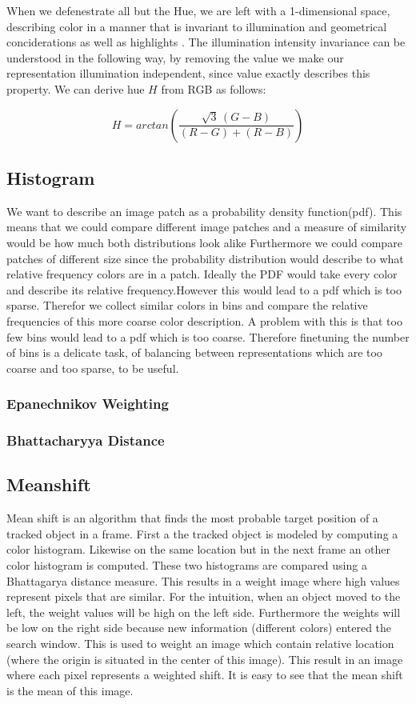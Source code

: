 \documentclass[a4paper,11pt]{article}
\begin{document}
When we defenestrate all but the Hue, we are left with a 1-dimensional space, describing color in a manner that is invariant to illumination and geometrical conciderations as well as highlights \cite{gevers_invariant}. The illumination intensity invariance can be understood in the following way, by removing the value we make our representation illumination independent, since value exactly describes this property. We can derive hue $H$ from RGB as follows:

\begin{equation}
\label{eq:hue}
H = arctan\left(\frac{\sqrt{3}\,(G-B)}{(R-G)+(R-B)}\right)
\end{equation} 
		 
\subsection{Histogram}
		We want to describe an image patch as a probability density function(pdf). This means that we could compare different image patches and a measure of similarity would be how much both distributions look alike %
		Furthermore we could compare patches of different size since the probability distribution would describe to what relative frequency colors are in a patch.
		Ideally the PDF  would take every color and describe its relative frequency.However this would lead to a pdf which is too sparse. Therefor we collect similar colors in bins and compare the relative frequencies of this more coarse color description. A problem with this is that too few bins would lead to a pdf which is too coarse. Therefore finetuning the number of bins is a delicate task, of balancing between representations which are too coarse and too sparse, to be useful. 
\subsubsection{Epanechnikov Weighting}
\subsubsection{Bhattacharyya Distance}
		
\subsection{Meanshift}
Mean shift is an algorithm that finds the most probable target position of a tracked object in a frame. First a the tracked object is modeled by computing a color histogram. Likewise on the same location but in the next frame an other color histogram is computed. These two histograms are compared using a Bhattagarya distance measure. This results in a weight image where high values represent pixels that are similar.  For the intuition, when an object moved to the left, the weight values will be high on the left side. Furthermore the weights will be low on the right side because new information (different colors) entered the search window. 
This is used to weight an image which contain relative location (where the origin is situated in the center of this image). This result in an image where each pixel represents a weighted shift. It is easy to see that the mean shift is the mean of this image.
\end{document}
